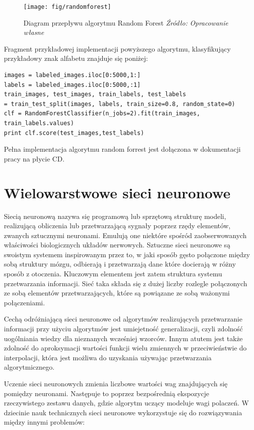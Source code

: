 \documentclass[brudnopis]{xmgr}
\begin{document}
\begin{figure}[!tbh]
\centering
\texttt{[image: fig/randomforest]}
\caption{Diagram przepływu algorytmu Random Forest \emph{Źródło: Opracowanie własne}}
\end{figure}
\newpage

Fragment przykładowej implementacji powyższego algorytmu, klasyfikujący przykładowy znak alfabetu znajduje się poniżej:

\begin{verbatim}
images = labeled_images.iloc[0:5000,1:]
labels = labeled_images.iloc[0:5000,:1]
train_images, test_images, train_labels, test_labels 
= train_test_split(images, labels, train_size=0.8, random_state=0)
clf = RandomForestClassifier(n_jobs=2).fit(train_images, train_labels.values)
print clf.score(test_images,test_labels)
\end{verbatim}

Pełna implementacja algorytmu random forrest jest dołączona w dokumentacji pracy na płycie CD. 

\section{Wielowarstwowe sieci neuronowe}

Siecią neuronową\cite{1}\cite{12} nazywa się programową lub sprzętową strukturę modeli, realizującą obliczenia lub przetwarzającą sygnały poprzez rzędy elementów, zwanych sztucznymi neuronami. Emulują one niektóre spośród zaobserwowanych właściwości biologicznych układów nerwowych. Sztuczne sieci neuronowe są swoistym systemem inspirowanym przez to, w jaki sposób gęsto połączone między sobą struktury mózgu, odbierają i przetwarzają dane które docierają w różny sposób z otoczenia. Kluczowym elementem jest zatem struktura systemu przetwarzania informacji. Sieć taka składa się z dużej liczby rozlegle połączonych ze sobą elementów przetwarzających, które są powiązane ze sobą ważonymi połączeniami.

Cechą odróżniającą sieci neuronowe od algorytmów realizujących przetwarzanie informacji przy użyciu algorytmów jest umiejetność generalizacji, czyli zdolność uogólniania wiedzy dla nieznanych wcześniej wzorców. Innym atutem jest także zdolność do aproksymacji wartości funkcji wielu zmiennych w przeciwieństwie do interpolacji, która jest możliwa do uzyskania używając przetwarzania algorytmicznego.

Uczenie sieci neuronowych zmienia liczbowe wartości wag znajdujących się pomiędzy neuronami. Następuje to poprzez bezpośrednią ekspozycje rzeczywistego zestawu danych, gdzie algorytm uczący modeluje wagi polaczeń. W dziecinie nauk technicznych sieci neuronowe wykorzystuje się do rozwiązywania między innymi problemów:
\end{document}
